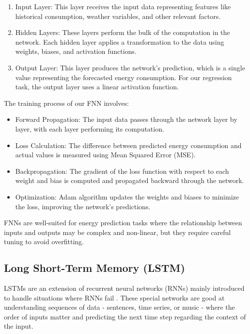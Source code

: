 \begin{enumerate}
    \item Input Layer: This layer receives the input data representing features like historical consumption, weather variables, and other relevant factors.
    \item Hidden Layers: These layers perform the bulk of the computation in the network. Each hidden layer applies a transformation to the data using weights, biases, and activation functions.
    \item Output Layer: This layer produces the network's prediction, which is a single value representing the forecasted energy consumption. For our regression task, the output layer uses a linear activation function.
\end{enumerate}

The training process of our FNN involves:

\begin{itemize}
    \item Forward Propagation: The input data passes through the network layer by layer, with each layer performing its computation.
    \item Loss Calculation: The difference between predicted energy consumption and actual values is measured using Mean Squared Error (MSE).
    \item Backpropagation: The gradient of the loss function with respect to each weight and bias is computed and propagated backward through the network.
    \item Optimization: Adam algorithm updates the weights and biases to minimize the loss, improving the network's predictions.
\end{itemize}

FNNs are well-suited for energy prediction tasks where the relationship between inputs and outputs may be complex and non-linear, but they require careful tuning to avoid overfitting.

\subsection{Long Short-Term Memory (LSTM)}
LSTMs are an extension of recurrent neural networks (RNNs) mainly introduced to handle situations where RNNs fail \cite{g4g_lstm}. These special networks are good at understanding sequences of data - sentences, time series, or music - where the order of inputs matter and predicting the next time step regarding the context of the input. 

